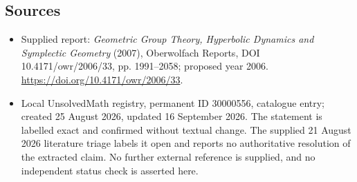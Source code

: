 \documentclass[11pt]{article}
\begin{document}
\subsection{Sources}
\begin{itemize}
\item Supplied report: \emph{Geometric Group Theory, Hyperbolic Dynamics and Symplectic Geometry} (2007), Oberwolfach Reports, DOI 10.4171/owr/2006/33, pp. 1991--2058; proposed year 2006. \url{https://doi.org/10.4171/owr/2006/33}.
\item Local UnsolvedMath registry, permanent ID 30000556, catalogue entry; created 25 August 2026, updated 16 September 2026. The statement is labelled exact and confirmed without textual change. The supplied 21 August 2026 literature triage labels it open and reports no authoritative resolution of the extracted claim. No further external reference is supplied, and no independent status check is asserted here.
\end{itemize}
\end{document}
